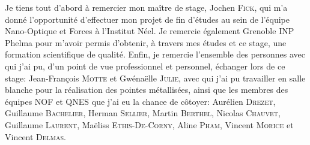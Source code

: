 \vspace{0.5cm}
Je tiens tout d'abord à remercier mon maître de stage, Jochen \textsc{Fick}, qui m'a donné l'opportunité d'effectuer mon projet de fin d'études au sein de l'équipe Nano-Optique et Forces à l'Institut Néel. Je remercie également Grenoble INP Phelma pour m'avoir permis d'obtenir, à travers mes études et ce stage, une formation scientifique de qualité.
Enfin, je remercie l'ensemble des personnes avec qui j'ai pu, d'un point de vue professionnel et personnel, échanger lors de ce stage: Jean-François \textsc{Motte} et Gwénaëlle \textsc{Julie}, avec qui j'ai pu travailler en salle blanche pour la réalisation des pointes métallisées, ainsi que les membres des équipes NOF et QNES que j'ai eu la chance de côtoyer: Aurélien \textsc{Drezet}, Guillaume \textsc{Bachelier}, Herman \textsc{Sellier}, Martin \textsc{Berthel}, Nicolas \textsc{Chauvet}, Guillaume \textsc{Laurent}, Maëliss \textsc{Ethis-De-Corny}, Aline \textsc{Pham}, Vincent \textsc{Morice} et Vincent \textsc{Delmas}.


\tableofcontents        %
\newpage
\listoffigures
{}  %
